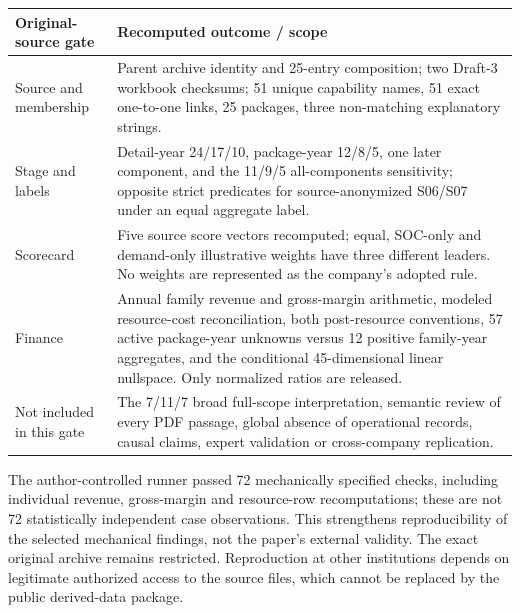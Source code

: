 \begin{center}
\begin{minipage}{\linewidth}
\centering\small
{}\label{tab:app-source-rerun}
\begin{tabularx}{\linewidth}{>{\raggedright\arraybackslash}p{3.25cm} X}
\toprule
Original-source gate & Recomputed outcome / scope\\
\midrule
Source and membership & Parent archive identity and 25-entry composition; two Draft-3 workbook checksums; 51 unique capability names, 51 exact one-to-one links, 25 packages, three non-matching explanatory strings.\\
Stage and labels & Detail-year 24/17/10, package-year 12/8/5, one later component, and the 11/9/5 all-components sensitivity; opposite strict predicates for source-anonymized S06/S07 under an equal aggregate label.\\
Scorecard & Five source score vectors recomputed; equal, SOC-only and demand-only illustrative weights have three different leaders. No weights are represented as the company's adopted rule.\\
Finance & Annual family revenue and gross-margin arithmetic, modeled resource-cost reconciliation, both post-resource conventions, 57 active package-year unknowns versus 12 positive family-year aggregates, and the conditional 45-dimensional linear nullspace. Only normalized ratios are released.\\
Not included in this gate & The 7/11/7 broad full-scope interpretation, semantic review of every PDF passage, global absence of operational records, causal claims, expert validation or cross-company replication.\\
\bottomrule
\end{tabularx}
\end{minipage}
\end{center}

The author-controlled runner passed 72 mechanically specified checks, including individual revenue, gross-margin and resource-row recomputations; these are not 72 statistically independent case observations. This strengthens reproducibility of the selected mechanical findings, not the paper's external validity. The exact original archive remains restricted. Reproduction at other institutions depends on legitimate authorized access to the source files, which cannot be replaced by the public derived-data package.



